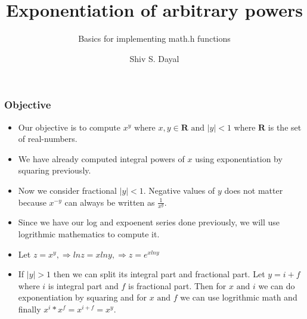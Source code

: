 \documentclass[aspectratio=1610]{beamer}
\begin{document}
\begin{frame}
\title{Exponentiation of arbitrary powers}
\subtitle{Basics for implementing math.h functions}
\author{Shiv S. Dayal}
\titlepage
\end{frame}

\begin{frame}
\frametitle{Objective}
\begin{itemize}
\item Our objective is to compute $x^y \text{ where } x, y \in \mathbf{R}
\text{ and } |y|<1$
where $\mathbf{R}$ is the set of real-numbers.
\item We have already computed integral powers of $x$ using exponentiation
by squaring previously.
\item Now we consider fractional $|y|<1$. Negative values of $y$ does not
matter because $x^{-y}$ can always be written as $\frac{1}{x^y}$.
\item Since we have our log and expoenent series done previously, we will
use logrithmic mathematics to compute it.
\item Let $z = x^y, \Rightarrow lnz = xlny, \Rightarrow z = e^{xlny}$
\item If $|y|>1$ then we can split its integral part and fractional part.
Let $y=i+f$ where $i$ is integral part and $f$ is fractional part. Then for
$x \text{ and } i$ we can do exponentiation by squaring and for $x
\text{ and } f$ we can use logrithmic math and finally $x^i*x^f=x^{i+f}=x^y$.
\end{itemize}
\end{frame}
\end{document}
